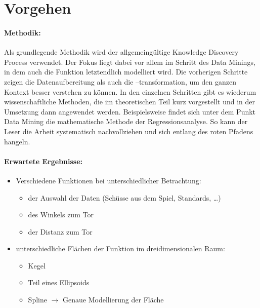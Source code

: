 \section{Vorgehen}

\paragraph{Methodik:}
Als grundlegende Methodik wird der allgemeingültige Knowledge Discovery Process verwendet. 
Der Fokus liegt dabei vor allem im Schritt des Data Minings, in dem auch die Funktion letztendlich modelliert wird. Die vorherigen Schritte zeigen die Datenaufbereitung als auch die –transformation, um den ganzen Kontext besser verstehen zu können. In den einzelnen Schritten gibt es wiederum wissenschaftliche Methoden, die im theoretischen Teil kurz vorgestellt und in der Umsetzung dann angewendet werden. Beispielsweise findet sich unter dem Punkt Data Mining die mathematische Methode der Regressionsanalyse. So kann der Leser die Arbeit systematisch nachvollziehen und sich entlang des roten Pfadens hangeln. 

\paragraph{Erwartete Ergebnisse:}
\begin{itemize}
\item Verschiedene Funktionen bei unterschiedlicher Betrachtung:
\begin{itemize}
\item der Auswahl der Daten (Schüsse aus dem Spiel, Standards, …)
\item des Winkels zum Tor
\item der Distanz zum Tor
\end{itemize}
\item unterschiedliche Flächen der Funktion im dreidimensionalen Raum:
\begin{itemize}
\item Kegel
\item Teil eines Ellipsoids
\item Spline $\rightarrow$ Genaue Modellierung der Fläche
\end{itemize}
\end{itemize}
